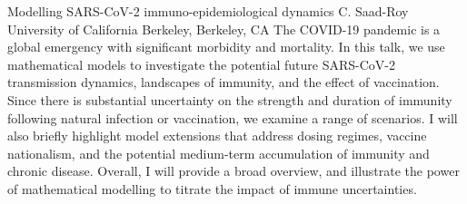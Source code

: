 
    \begin{abstract_online}{Modelling SARS-CoV-2 immuno-epidemiological dynamics}{%
        C. Saad-Roy}{%
        }{%
        University of California Berkeley, Berkeley, CA}
    The COVID-19 pandemic is a global emergency with significant morbidity and mortality. In this talk, we use mathematical models to investigate the potential future SARS-CoV-2 transmission dynamics, landscapes of immunity, and the effect of vaccination. Since there is substantial uncertainty on the strength and duration of immunity following natural infection or vaccination, we examine a range of scenarios. I will also briefly highlight model extensions that address dosing regimes, vaccine nationalism, and the potential medium-term accumulation of immunity and chronic disease. Overall, I will provide a broad overview, and illustrate the power of mathematical modelling to titrate the impact of immune uncertainties. 
    
    \end{abstract_online}
    